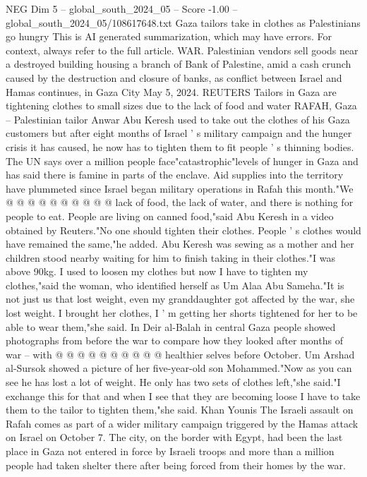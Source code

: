 \begin{textsample}{NEG Dim 5 – global\_south\_2024\_05 – Score -1.00 – global\_south\_2024\_05/108617648.txt}  \label{ex:f5_neg_384}
Gaza tailors take in clothes as Palestinians go hungry This is AI generated summarization, which may have errors.
For context, always refer to the full article.
WAR.
Palestinian vendors sell goods near a destroyed building housing a branch of Bank of Palestine, amid a cash crunch caused by the destruction and closure of banks, as conflict between Israel and Hamas continues, in Gaza City May 5, 2024.
REUTERS Tailors in Gaza are tightening clothes to small sizes due to the lack of food and water RAFAH, Gaza -- Palestinian tailor Anwar Abu Keresh used to take out the clothes of his Gaza customers but after eight months of Israel ' s military campaign and the hunger crisis it has caused, he now has to tighten them to fit people ' s thinning bodies.
The UN says over a million people face"catastrophic"levels of hunger in Gaza and has said there is famine in parts of the enclave.
Aid supplies into the territory have plummeted since Israel began military operations in Rafah this month."We @ @ @ @ @ @ @ @ @ @ lack of food, the lack of water, and there is nothing for people to eat.
People are living on canned food,"said Abu Keresh in a video obtained by Reuters."No one should tighten their clothes.
People ' s clothes would have remained the same,"he added.
Abu Keresh was sewing as a mother and her children stood nearby waiting for him to finish taking in their clothes."I was above 90kg.
I used to loosen my clothes but now I have to tighten my clothes,"said the woman, who identified herself as Um Alaa Abu Sameha."It is not just us that lost weight, even my granddaughter got affected by the war, she lost weight.
I brought her clothes, I ' m getting her shorts tightened for her to be able to wear them,"she said.
In Deir al-Balah in central Gaza people showed photographs from before the war to compare how they looked after months of war -- with @ @ @ @ @ @ @ @ @ @ healthier selves before October.
Um Arshad al-Sursok showed a picture of her five-year-old son Mohammed."Now as you can see he has lost a lot of weight.
He only has two sets of clothes left,"she said."I exchange this for that and when I see that they are becoming loose I have to take them to the tailor to tighten them,"she said.
Khan Younis The Israeli assault on Rafah comes as part of a wider military campaign triggered by the Hamas attack on Israel on October 7.
The city, on the border with Egypt, had been the last place in Gaza not entered in force by Israeli troops and more than a million people had taken shelter there after being forced from their homes by the war.

\end{textsample}
